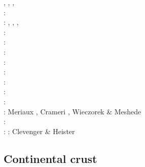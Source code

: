 \begin{scriptsize}
\cite{moql07},
\cite{geyu07},
\cite{dadh07},
\cite{zldf07}\\
\twothousandeight: \cite{zhmt08}\cite{deka08}\cite{trub08}\cite{krdp08}\cite{mamo08}\cite{gepd98}
      \cite{vack08}\cite{heta08}\cite{brtf08}\cite{daks08}\cite{chzy08}\cite{tack08}\cite{hust08b}\\
\twothousandnine: \cite{king09}, \cite{geum09}, \cite{vemm09}, 
                  \cite{qurj09}\\
\twothousandten: \cite{kaus10}\cite{kamm10}\cite{egat10}\cite{kilv10}\\
\twothousandeleven: \cite{dumg11}\cite{uibb11}\cite{hegc11}\cite{muso11}\cite{dawk11}\cite{lemm11}\\
\twothousandtwelve: \cite{crsg12}\cite{chgv12}\cite{krwd12}\cite{may12}\cite{gerb12}\cite{asmo12}\\
\twothousandthirteen: \cite{chtl13}\cite{kemk13}\cite{gemd13}\cite{hutm13}\\
\twothousandfourteen: \cite{thmk14}\cite{mabl14}\cite{lopp14}\cite{stlh14}\\
\twothousandfifteen: \cite{lelk15}\cite{rumi15}\cite{chpe15}\cite{mabl15}\\
\twothousandsixteen: \cite{dumy16}\cite{blmp16}\\
\twothousandseventeen: \cite{robh17}\cite{wisv17}\cite{majc17}\\
\twothousandeighteen: Meriaux \etal \cite{memm18}, Crameri \cite{cram18}, Wieczorek \& Meshede \cite{wime18}\\
\twothousandnineteen: \cite{liki19}\cite{demh19}\cite{galb19}\cite{frtv19}\cite{yuwa19}\cite{ropu19}\\
\twothousandtwenty: \cite{homb20}\cite{trlb20}\cite{gadb20}\cite{jaca20a,jaca20b} 
\twothousandtwentyone: Clevenger \& Heister \cite{clhe21}
\end{scriptsize}

\subsection{Continental crust} 

